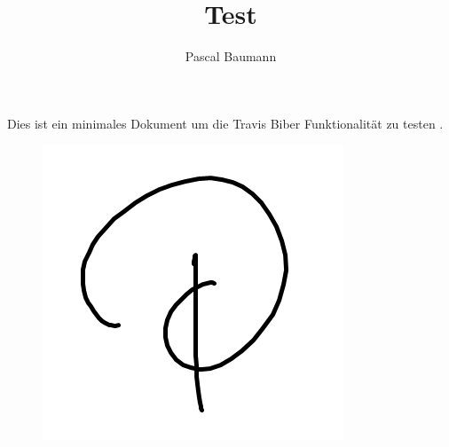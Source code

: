 \documentclass[a4paper]{scrreprt}
\title{Test}
\author{Pascal Baumann}
\begin{document}
\maketitle
\begin{abstract}
\end{abstract}

Dies ist ein minimales Dokument um die Travis Biber Funktionalität zu testen \parencite{Baumann2019}.

\begin{figure}[h!]
	\includegraphics{./Test.png}
\end{figure}
\end{document}
